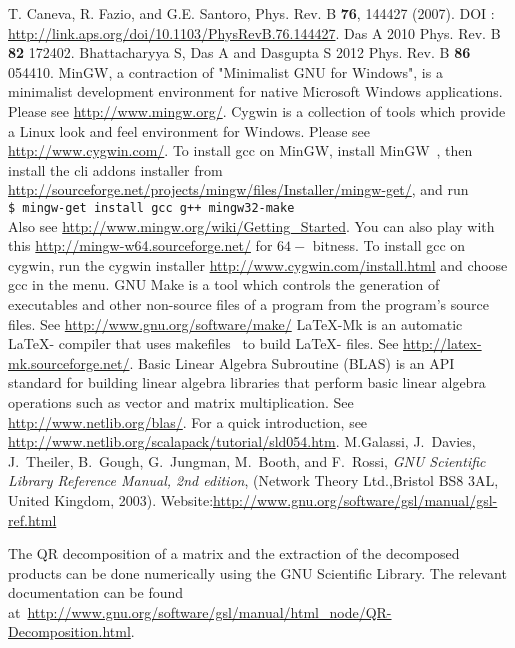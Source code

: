 \documentclass[a4paper,10pt]{article}
\newcommand{\shellcmd}[1]{\\\indent\indent\texttt{\footnotesize\$ #1}\\}
\begin{document}
\begin{thebibliography}{10}
\newblock T. Caneva, R. Fazio, and G.E. Santoro, Phys. Rev. B {\bf 76}, 144427 (2007).
\newblock DOI : \url{http://link.aps.org/doi/10.1103/PhysRevB.76.144427}.
 Das A 2010 {Phys. Rev. B} {\bf 82} 172402. Bhattacharyya S, Das A
and Dasgupta S 2012 {Phys. Rev. B} {\bf 86} 054410.
MinGW, a contraction of "Minimalist GNU for Windows", is a minimalist development environment for native Microsoft Windows applications.
Please see \url{http://www.mingw.org/}.
Cygwin is a collection of tools which provide a Linux look and feel environment for Windows. Please see \url{http://www.cygwin.com/}.
\newblock To install gcc on MinGW, install MinGW~\cite{mingw}, then install the cli addons installer from \url{http://sourceforge.net/projects/mingw/files/Installer/mingw-get/}, and run
\shellcmd{mingw-get install gcc g++ mingw32-make}
Also see \url{http://www.mingw.org/wiki/Getting_Started}. You can also play with this \url{http://mingw-w64.sourceforge.net/} for $64-$ bitness.
\newblock To install gcc on cygwin, run the cygwin installer \url{http://www.cygwin.com/install.html} and choose gcc in the menu. 
GNU Make is a tool which controls the generation of executables and other non-source files of a program from the program's source files. See
\url{http://www.gnu.org/software/make/}
LaTeX-Mk is an automatic \LaTeX - compiler that uses makefiles~\cite{make} to build \LaTeX - files. See \url{http://latex-mk.sourceforge.net/}.
Basic Linear Algebra Subroutine (BLAS) is an API standard for building linear algebra libraries that perform basic linear algebra operations such as vector and matrix multiplication. See \url{http://www.netlib.org/blas/}. For a quick introduction, see \url{http://www.netlib.org/scalapack/tutorial/sld054.htm}.
M.Galassi, J.~Davies, J.~Theiler, B.~Gough, G.~Jungman, M.~Booth, and F.~Rossi, 
{\em GNU Scientific Library Reference Manual,  2nd edition},
(Network Theory Ltd.,Bristol BS8 3AL, United Kingdom, 2003).
\newblock Website:\url{http://www.gnu.org/software/gsl/manual/gsl-ref.html}

The QR decomposition of a matrix and the extraction of the decomposed products can be done numerically using the GNU Scientific Library. The relevant documentation can be found at~\url{http://www.gnu.org/software/gsl/manual/html_node/QR-Decomposition.html}.


\end{thebibliography}
\end{document}
